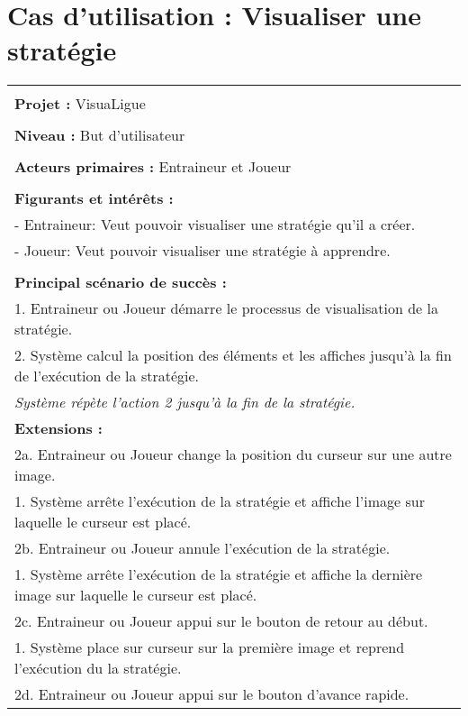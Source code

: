 \section{Cas d'utilisation : Visualiser une stratégie}
\begin{longtable}{|p{16cm}|}
	\hline
	\\
	\textbf{Projet :} VisuaLigue\\
	\\
	\textbf{Niveau :} But d'utilisateur\\
	\\
	\textbf{Acteurs primaires :} Entraineur et Joueur\\
	\\
	\textbf{Figurants et intérêts :} \\
	- Entraineur: Veut pouvoir visualiser une stratégie qu'il a créer.\\
	- Joueur: Veut pouvoir visualiser une stratégie à apprendre.\\
	\\
	\textbf{Principal scénario de succès :}\\
	1. Entraineur ou Joueur démarre le processus de visualisation de la stratégie.\\
	2. Système calcul la position des éléments et les affiches jusqu'à la fin de l'exécution de la stratégie.\\
	\hspace{1cm} \em Système répète l'action 2 jusqu'à la fin de la stratégie.
	\\
	\textbf{Extensions :}\\
	2a. Entraineur ou Joueur change la position du curseur sur une autre image.\\
	\hspace{1cm}1. Système arrête l'exécution de la stratégie et affiche l'image sur laquelle le curseur est placé.\\
	2b. Entraineur ou Joueur annule l'exécution de la stratégie.\\
	\hspace{1cm}1. Système arrête l'exécution de la stratégie et affiche la dernière image sur laquelle le curseur est placé.\\
	2c. Entraineur ou Joueur appui sur le bouton de retour au début.\\
	\hspace{1cm}1. Système place sur curseur sur la première image et reprend l'exécution du la stratégie.\\
	2d. Entraineur ou Joueur appui sur le bouton d'avance rapide.\\

\end{longtable}
